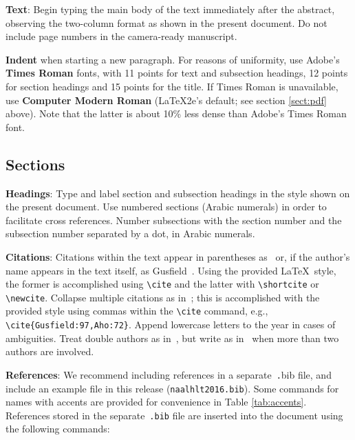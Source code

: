 \documentclass{article}
\begin{document}
{\bf Text}: Begin typing the main body of the text immediately after
the abstract, observing the two-column format as shown in 
the present document.  Do not include page numbers in the camera-ready manuscript.  

{\bf Indent} when starting a new paragraph. For reasons of uniformity,
use Adobe's {\bf Times Roman} fonts, with 11 points for text and 
subsection headings, 12 points for section headings and 15 points for
the title.  If Times Roman is unavailable, use {\bf Computer Modern
  Roman} (\LaTeX2e{}'s default; see section \ref{sect:pdf} above).
Note that the latter is about 10\% less dense than Adobe's Times Roman
font.

\subsection{Sections}

{\bf Headings}: Type and label section and subsection headings in the
style shown on the present document.  Use numbered sections (Arabic
numerals) in order to facilitate cross references. Number subsections
with the section number and the subsection number separated by a dot,
in Arabic numerals. 

{\bf Citations}: Citations within the text appear
in parentheses as~\cite{Gusfield:97} or, if the author's name appears in
the text itself, as Gusfield~.  Using the provided \LaTeX\ style, the former is accomplished using
{\small\verb|\cite|} and the latter with {\small\verb|\shortcite|} or {\small\verb|\newcite|}.  Collapse multiple citations as in~\cite{Gusfield:97,Aho:72}; this is accomplished with the provided style using commas within the {\small\verb|\cite|} command, e.g., {\small\verb|\cite{Gusfield:97,Aho:72}|}.  
Append lowercase letters to the year in cases of ambiguities.  
Treat double authors as in~\cite{Aho:72}, but write as 
in~\cite{Chandra:81} when more than two authors are involved.  

\textbf{References}:  We recommend
including references in a separate~{\small\texttt .bib} file, and include an example file 
in this release ({\small\tt naalhlt2016.bib}).  Some commands
for names with accents are provided for convenience in Table \ref{tab:accents}.  
References stored in the separate~{\small\tt .bib} file are inserted into the document using the following commands:

\small
\begin{verbatim}


\end{verbatim}
\normalsize 
\end{document}
